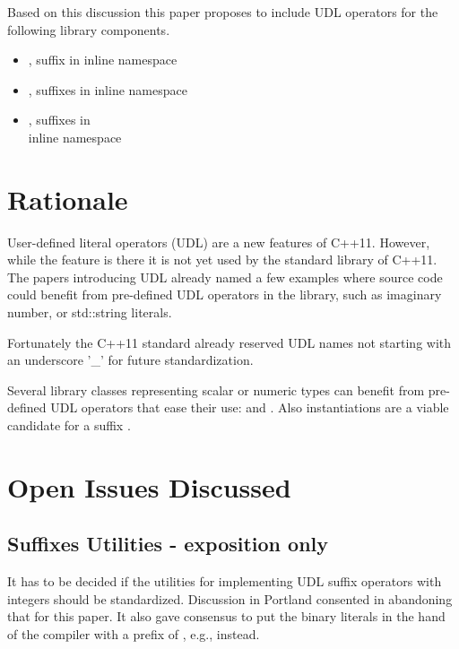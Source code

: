 \documentclass[ebook,11pt,article]{memoir}
\begin{document}
Based on this discussion this paper proposes to include UDL operators for the following library components.
\begin{itemize}
\item {}, suffix  in inline namespace 
\item {}, suffixes  in inline namespace 
\item {}, suffixes  in \\inline namespace 
\end{itemize}

\section{Rationale}
User-defined literal operators (UDL) are a new features of C++11. However, while the feature is there it is not yet used by the standard library of C++11. The papers introducing UDL already named a few examples where source code could benefit from pre-defined UDL operators in the library, such as imaginary number, or std::string literals.

Fortunately the C++11 standard already reserved UDL names not starting with an underscore '_' for future standardization. 

Several library classes representing scalar or numeric types can benefit from pre-defined UDL operators that ease their use:  and . Also  instantiations are a viable candidate for a suffix .

\section{Open Issues Discussed}
\subsection{Suffixes Utilities - exposition only}
It has to be decided if the utilities for implementing UDL suffix operators with integers should be standardized.
Discussion in Portland consented in abandoning that for this paper. It also gave consensus to put the binary literals in the hand of the compiler with a prefix of , e.g.,  instead.
\end{document}
